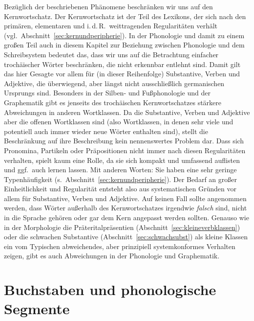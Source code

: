 Bezüglich der beschriebenen Phänomene beschränken wir uns auf den Kernwortschatz.
Der Kernwortschatz ist der Teil des Lexikons, der sich nach den primären, elementaren und i.\,d.\,R.\ weittragenden Regularitäten verhält (vgl.\ Abschnitt~\ref{sec:kernundperipherie}).
In der Phonologie und damit zu einem großen Teil auch in diesem Kapitel zur Beziehung zwischen Phonologie und dem Schreibsystem bedeutet das, dass wir uns auf die Betrachtung einfacher trochäischer Wörter beschränken, die nicht erkennbar entlehnt sind.
Damit gilt das hier Gesagte vor allem für (in dieser Reihenfolge) Substantive, Verben und Adjektive, die überwiegend, aber längst nicht ausschließlich germanischen Ursprungs sind.
Besonders in der Silben- und Fußphonologie und der Graphematik gibt es jenseits des trochäischen Kernwortschatzes stärkere Abweichungen in anderen Wortklassen.
Da die Substantive, Verben und Adjektive aber die offenen Wortklassen sind (also Wortklassen, in denen sehr viele und potentiell auch immer wieder neue Wörter enthalten sind), stellt die Beschränkung auf ihre Beschreibung kein nennenswertes Problem dar.
Dass sich Pronomina, Partikeln oder Präpositionen nicht immer nach diesen Regularitäten verhalten, spielt kaum eine Rolle, da sie sich kompakt und umfassend auflisten und ggf.\ auch lernen lassen.
Mit anderen Worten:
Sie haben eine sehr geringe Typenhäufigkeit (s.\ Abschnitt~\ref{sec:kernundperipherie}).
Der Bedarf an großer Einheitlichkeit und Regularität entsteht also aus systematischen Gründen vor allem für Substantive, Verben und Adjektive.
Auf keinen Fall sollte angenommen werden, dass Wörter außerhalb des Kernwortschatzes irgendwie \textit{falsch} sind, nicht in die Sprache gehören oder gar dem Kern angepasst werden sollten.
Genauso wie in der Morphologie die Präteritalpräsentien (Abschnitt~\ref{sec:kleineverbklassen}) oder die schwachen Substantive (Abschnitt~\ref{sec:schwachsubst}) als kleine Klassen ein vom Typischen abweichendes, aber prinzipiell systemkonformes Verhalten zeigen, gibt es auch Abweichungen in der Phonologie und Graphematik.




\section{Buchstaben und phonologische Segmente}

